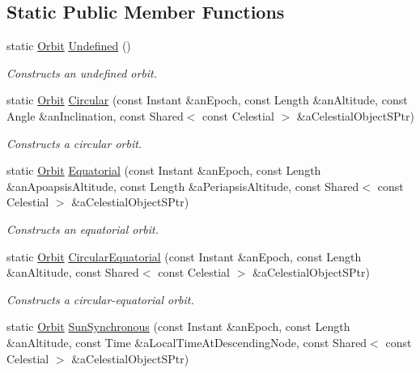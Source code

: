 \subsection*{Static Public Member Functions}
\begin{DoxyCompactItemize}
\item 
static \hyperlink{classlibrary_1_1astro_1_1trajectory_1_1_orbit}{Orbit} \hyperlink{classlibrary_1_1astro_1_1trajectory_1_1_orbit_a1623802ee44bab50e24f3c1979bb5001}{Undefined} ()
\begin{DoxyCompactList}\small\item\em Constructs an undefined orbit. \end{DoxyCompactList}\item 
static \hyperlink{classlibrary_1_1astro_1_1trajectory_1_1_orbit}{Orbit} \hyperlink{classlibrary_1_1astro_1_1trajectory_1_1_orbit_a8dc9d8da5605ef480d3f3e53472595e0}{Circular} (const Instant \&an\+Epoch, const Length \&an\+Altitude, const Angle \&an\+Inclination, const Shared$<$ const Celestial $>$ \&a\+Celestial\+Object\+S\+Ptr)
\begin{DoxyCompactList}\small\item\em Constructs a circular orbit. \end{DoxyCompactList}\item 
static \hyperlink{classlibrary_1_1astro_1_1trajectory_1_1_orbit}{Orbit} \hyperlink{classlibrary_1_1astro_1_1trajectory_1_1_orbit_ab15a55f74105cd78fe8a48a3c86baacc}{Equatorial} (const Instant \&an\+Epoch, const Length \&an\+Apoapsis\+Altitude, const Length \&a\+Periapsis\+Altitude, const Shared$<$ const Celestial $>$ \&a\+Celestial\+Object\+S\+Ptr)
\begin{DoxyCompactList}\small\item\em Constructs an equatorial orbit. \end{DoxyCompactList}\item 
static \hyperlink{classlibrary_1_1astro_1_1trajectory_1_1_orbit}{Orbit} \hyperlink{classlibrary_1_1astro_1_1trajectory_1_1_orbit_a580fd937ebef4b66a9c68bfe41cde8ea}{Circular\+Equatorial} (const Instant \&an\+Epoch, const Length \&an\+Altitude, const Shared$<$ const Celestial $>$ \&a\+Celestial\+Object\+S\+Ptr)
\begin{DoxyCompactList}\small\item\em Constructs a circular-\/equatorial orbit. \end{DoxyCompactList}\item 
static \hyperlink{classlibrary_1_1astro_1_1trajectory_1_1_orbit}{Orbit} \hyperlink{classlibrary_1_1astro_1_1trajectory_1_1_orbit_af1a3fb89d7bdb29ccf1867fa58d9bcab}{Sun\+Synchronous} (const Instant \&an\+Epoch, const Length \&an\+Altitude, const Time \&a\+Local\+Time\+At\+Descending\+Node, const Shared$<$ const Celestial $>$ \&a\+Celestial\+Object\+S\+Ptr)

\end{DoxyCompactItemize}
